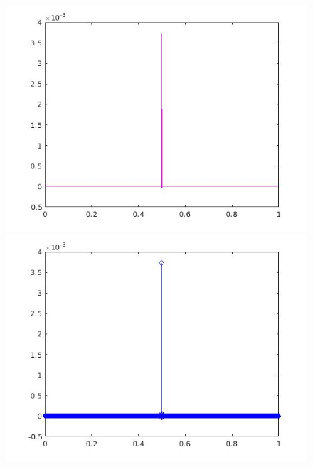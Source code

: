 \documentclass[a4paper,11pt]{article}
\begin{document}
\begin{figure}[!hp]
\centering
\begin{minipage}{.5\textwidth}
  \centering
  \includegraphics[width=1\linewidth]{images/lab2_64.jpg}
\end{minipage}%
\begin{minipage}{.5\textwidth}
  \centering
  \includegraphics[width=1\linewidth]{images/lab2_65.jpg}
\end{minipage}
\end{figure}

\newpage
\end{document}
